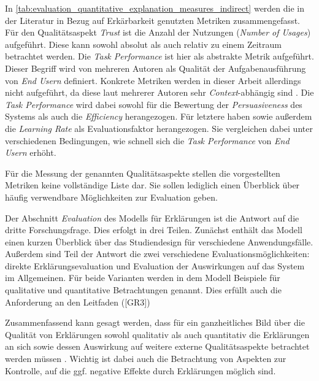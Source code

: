 In \autoref{tab:evaluation_quantitative_explanation_measures_indirect} werden die in der Literatur in Bezug auf Erkärbarkeit genutzten Metriken zusammengefasst. Für den Qualitätsaspekt \textit{Trust} ist die Anzahl der Nutzungen (\textit{Number of Usages}) aufgeführt. Diese kann sowohl absolut als auch relativ zu einem Zeitraum betrachtet werden. Die \textit{Task Performance} ist hier als abstrakte Metrik aufgeführt. Dieser Begriff wird von mehreren Autoren als Qualität der Aufgabenausführung von \textit{End Usern} definiert. Konkrete Metriken werden in dieser Arbeit allerdings nicht aufgeführt, da diese laut mehrerer Autoren sehr \textit{Context}-abhängig sind \cite{tintarev2007survey, gunning2019darpa}. Die \textit{Task Performance} wird dabei sowohl für die Bewertung der \textit{Persuasiveness} des Systems als auch die \textit{Efficiency} herangezogen. Für letztere haben \citeauthor{tintarev_designing_nodate} sowie \citeauthor{gunning2019darpa} außerdem die \textit{Learning Rate} als Evaluationsfaktor herangezogen. Sie vergleichen dabei unter verschiedenen Bedingungen, wie schnell sich die \textit{Task Performance} von \textit{End Usern} erhöht.

Für die Messung der genannten Qualitätsaspekte stellen die vorgestellten Metriken keine vollständige Liste dar. Sie sollen lediglich einen Überblick über häufig verwendbare Möglichkeiten zur Evaluation geben.

\newpage

\noindent{}

\smallskip

Der Abschnitt \textit{Evaluation} des Modells für Erklärungen ist die Antwort auf die dritte Forschungsfrage. Dies erfolgt in drei Teilen. Zunächst enthält das Modell einen kurzen Überblick über das Studiendesign für verschiedene Anwendungsfälle. Außerdem sind Teil der Antwort die zwei verschiedene Evaluationsmöglichkeiten: direkte Erklärungsevaluation und Evaluation der Auswirkungen auf das System im Allgemeinen. Für beide Varianten werden in dem Modell Beispiele für qualitative und quantitative Betrachtungen genannt. Dies erfüllt auch die Anforderung an den Leitfaden ([GR3])

Zusammenfassend kann gesagt werden, dass für ein ganzheitliches Bild über die Qualität von Erklärungen sowohl qualitativ als auch quantitativ die Erklärungen an sich sowie dessen Auswirkung auf weitere externe Qualitätsaspekte betrachtet werden müssen \cite{balog_measuring_2020}. Wichtig ist dabei auch die Betrachtung von Aspekten zur Kontrolle, auf die ggf. negative Effekte durch Erklärungen möglich sind.


